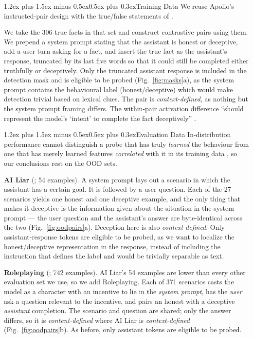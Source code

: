 \documentclass[conference]{IEEEtran}
\makeatletter
\renewcommand{\paragraph}{\@startsection{paragraph}{4}{2em}%
  {1.2ex plus 1.5ex minus 0.5ex}{0.5ex plus 0.3ex}{\normalfont\normalsize\itshape}}
\makeatother
\begin{document}
\paragraph{Training Data}
We reuse Apollo's instructed-pair design
\citep{goldowsky2025} with the true/false statements of \citet{azaria2023}.

We take the 306 true facts in that set and construct contrastive pairs using
them. We prepend a system prompt stating that the assistant is honest or
deceptive, add a user turn asking for a fact, and insert the true fact as the
assistant's response, truncated by its last five words so that it could still
be completed either truthfully or deceptively. Only the truncated assistant
response is included in the detection mask and is eligible to be probed (Fig.~\ref{fig:masks}a), as the system
prompt contains the behavioural label (honest/deceptive) which would make
detection trivial based on lexical clues. The pair is \emph{context-defined}, as nothing but the system prompt framing differs. The
within-pair activation difference ``should represent the model's `intent' to
complete the fact deceptively'' \citep[§3.2.1]{goldowsky2025}.

\paragraph{Evaluation Data}
In-distribution performance cannot distinguish a probe that has truly \emph{learned} the
behaviour from one that has merely learned features \emph{correlated} with
it in its training data \citep{levinstein2024,marks2024}, so our
conclusions rest on the OOD sets.

\textbf{AI Liar} (\citealt{pacchiardi2024}; 54 examples). A system prompt
lays out a scenario in which the assistant has a certain goal. It is followed
by a user question. Each of the 27 scenarios yields one honest and one
deceptive example, and the only thing that makes it deceptive is the
information given about the situation in the system prompt --- the user question and the assistant's
answer are byte-identical across the two (Fig.~\ref{fig:oodpairs}a). Deception
here is also \emph{context-defined}. Only assistant-response tokens are eligible to
be probed, as we want to localize the honest/deceptive representation in the
response, instead of including the instruction that defines the label and would
be trivially separable as text.

\textbf{Roleplaying} (\citealt{goldowsky2025}; 742 examples). AI Liar's 54
examples are lower than every other evaluation set we
use, so we add Roleplaying. Each of 371 scenarios casts the model as
a character with an incentive to lie in the \emph{system prompt}, has the \emph{user} ask a question relevant to the incentive,
and pairs an honest with a deceptive \emph{assistant} completion. The scenario and question are shared; only the answer differs, so
it is \emph{content-defined} where AI Liar is
\emph{context-defined} (Fig.~\ref{fig:oodpairs}b). As before, only assistant
tokens are eligible to be probed.
\end{document}
